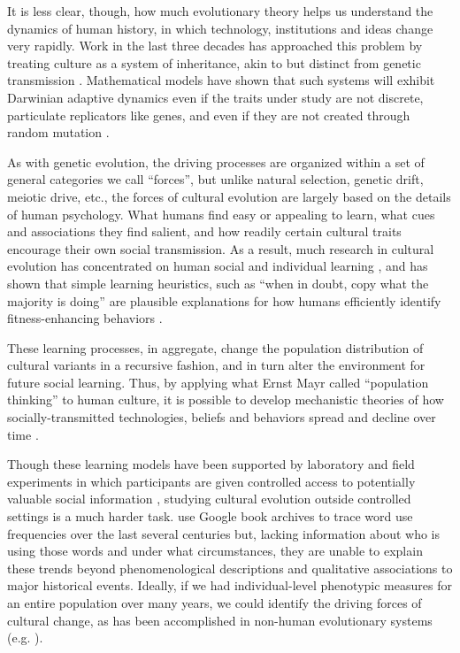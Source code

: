 \documentclass[reqno,12pt]{amsart}
\begin{document}
It is less clear, though, how much evolutionary theory helps us
understand the dynamics of human history, in which technology,
institutions and ideas change very rapidly. Work in the last three
decades has approached this problem by treating culture as a system of
inheritance, akin to but distinct from genetic transmission
\citep{Durham1992coevolution, Richerson2005}. Mathematical models have
shown that such systems will exhibit Darwinian adaptive dynamics even if
the traits under study are not discrete, particulate replicators like
genes, and even if they are not created through random mutation
\citep{boyd1985culture, Henrich2002}.

As with genetic evolution, the driving processes are organized within a
set of general categories we call ``forces'', but unlike natural
selection, genetic drift, meiotic drive, etc., the forces of cultural
evolution are largely based on the details of human psychology. What
humans find easy or appealing to learn, what cues and associations they
find salient, and how readily certain cultural traits encourage their
own social transmission. As a result, much research in cultural
evolution has concentrated on human social and individual learning
\citep{Mesoudi2006}, and has shown that simple learning heuristics, such
as ``when in doubt, copy what the majority is doing'' are plausible
explanations for how humans efficiently identify fitness-enhancing
behaviors \citep{McElreathetalSuccessbias2008}.

These learning processes, in aggregate, change the population
distribution of cultural variants in a recursive fashion, and in turn
alter the environment for future social learning. Thus, by applying what
Ernst Mayr called ``population thinking'' to human culture, it is
possible to develop mechanistic theories of how socially-transmitted
technologies, beliefs and behaviors spread and decline over time
\citep{shennan2009pattern}.

Though these learning models have been supported by laboratory and field
experiments in which participants are given controlled access to
potentially valuable social information
\citep{baum2004cultural, caldwell2008studying, effersontakezawa2007, Mesoudi2011a},
studying cultural evolution outside controlled settings is a much harder
task. \citet{michel2011quantitative} use Google book archives to trace
word use frequencies over the last several centuries but, lacking
information about who is using those words and under what circumstances,
they are unable to explain these trends beyond phenomenological
descriptions and qualitative associations to major historical events.
Ideally, if we had individual-level phenotypic measures for an entire
population over many years, we could identify the driving forces of
cultural change, as has been accomplished in non-human evolutionary
systems (e.g. \citet{grant2002unpredictable, ozgul2009dynamics}).
\end{document}
